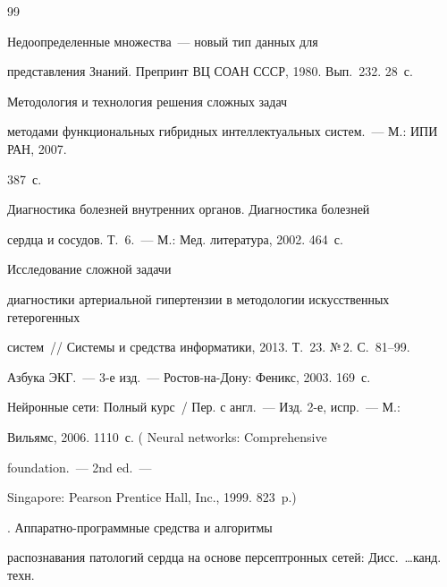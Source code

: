 {\small\frenchspacing


{%




\begin{thebibliography}{99}







 Недоопределенные множества~--- новый тип данных для


пред\-став\-ле\-ния Знаний. Препринт ВЦ СОАН СССР, 1980. Вып.~232. 28~с.




 Методология и технология решения сложных задач


методами функциональных гибридных интеллектуальных систем.~--- М.: ИПИ РАН, 2007.


387~с.




 Диагностика болезней внутренних органов. Диагностика болезней


сердца и сосудов. Т.~6.~--- М.: Мед. литература, 2002. 464~с.




 Исследование сложной задачи


диагностики артериальной гипертензии в методологии искусственных гетерогенных


сис\-тем~/\!\!/ Системы и средства информатики, 2013. Т.~23. №\,2. С.~81--99.




 Азбука ЭКГ.~--- 3-е изд.~--- Ростов-на-Дону: Феникс, 2003. 169~с.




 Нейронные сети: Полный курс~/ Пер. с англ.~--- Изд. 2-е, испр.~--- М.:


Вильямс, 2006. 1110~с. ( Neural networks: Comprehensive


foundation.~--- 2nd ed.~---


Singapore: Pearson Prentice Hall, Inc., 1999. 823~p.)




. Ап\-па\-рат\-но-про\-грам\-мные средства и алгоритмы


распознавания патологий сердца на основе персептронных сетей: Дисс.\ \ldots канд. техн.



\end{thebibliography}}}
